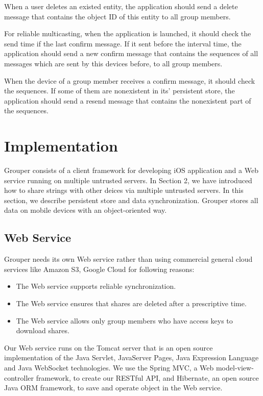\documentclass[twocolumn,10pt]{article}
\begin{document}
When a user deletes an existed entity, the application should send a delete message that contains the object ID of this entity to all group members.

For reliable multicasting, when the application is launched, it should check the send time if the last confirm message. If it sent before the interval time, the application should send a new confirm message that contains the sequences of all messages which are sent by this devices before, to all group members.

When the device of a group member receives a confirm message, it should check the sequences. If some of them are nonexistent in its' persistent store, the application should send a resend message that contains the nonexistent part of the sequences.

\section{Implementation}

Grouper consists of a client framework for developing iOS application and a Web service running on multiple untrusted servers. In Section 2, we have introduced how to share strings with other deices via multiple untrusted servers. In this section, we describe persistent store and data synchronization. Grouper stores all data on mobile devices with an object-oriented way.

\subsection{Web Service}
Grouper needs its own Web service rather than using commercial general cloud services like Amazon S3, Google Cloud for following reasons:

\begin{itemize}
	\setlength{\itemsep}{1pt}
	\setlength{\parskip}{0pt}
	\setlength{\parsep}{0pt}
	\item The Web service supports reliable synchronization.
	\item The Web service ensures that shares are deleted after a prescriptive time.
	\item The Web service allows only group members who have access keys to download shares.
\end{itemize}

Our Web service runs on the Tomcat server that is an open source implementation of the Java Servlet, JavaServer Pages, Java Expression Language and Java WebSocket technologies. We use the Spring MVC, a  Web model-view-controller framework, to create our RESTful API, and Hibernate, an open source Java ORM framework, to save and operate object in the Web service. 
\end{document}
